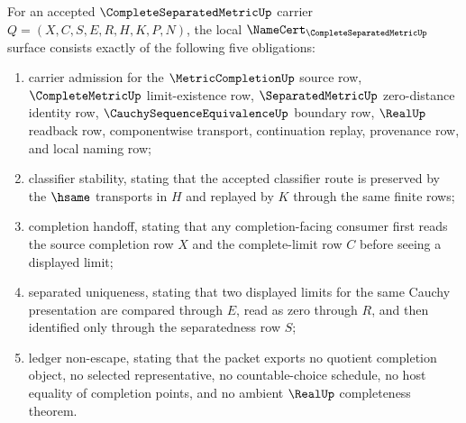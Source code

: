 \begin{theorem}\label{thm:complete-separated-metric-namecert-obligations}
For an accepted $\CompleteSeparatedMetricUp$ carrier $Q=(X,C,S,E,R,H,K,P,N)$, the local $\NameCert_{\CompleteSeparatedMetricUp}$ surface consists exactly of the following five obligations:
\begin{enumerate}
\item carrier admission for the $\MetricCompletionUp$ source row, $\CompleteMetricUp$ limit-existence row, $\SeparatedMetricUp$ zero-distance identity row, $\CauchySequenceEquivalenceUp$ boundary row, $\RealUp$ readback row, componentwise transport, continuation replay, provenance row, and local naming row;
\item classifier stability, stating that the accepted classifier route is preserved by the $\hsame$ transports in $H$ and replayed by $K$ through the same finite rows;
\item completion handoff, stating that any completion-facing consumer first reads the source completion row $X$ and the complete-limit row $C$ before seeing a displayed limit;
\item separated uniqueness, stating that two displayed limits for the same Cauchy presentation are compared through $E$, read as zero through $R$, and then identified only through the separatedness row $S$;
\item ledger non-escape, stating that the packet exports no quotient completion object, no selected representative, no countable-choice schedule, no host equality of completion points, and no ambient $\RealUp$ completeness theorem.
\end{enumerate}
\end{theorem}

